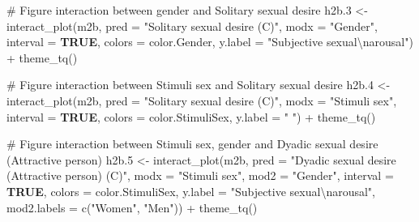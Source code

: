 \documentclass[
  bookmarksnumbered]{article}
\newenvironment{Shaded}{\begin{snugshade}}{\end{snugshade}}
\newcommand{\AttributeTok}[1]{\textcolor[rgb]{0.80,0.80,0.80}{#1}}
\newcommand{\CommentTok}[1]{\textcolor[rgb]{0.50,0.62,0.50}{#1}}
\newcommand{\ConstantTok}[1]{\textcolor[rgb]{0.86,0.64,0.64}{\textbf{#1}}}
\newcommand{\FloatTok}[1]{\textcolor[rgb]{0.75,0.75,0.82}{#1}}
\newcommand{\FunctionTok}[1]{\textcolor[rgb]{0.94,0.94,0.56}{#1}}
\newcommand{\NormalTok}[1]{\textcolor[rgb]{0.80,0.80,0.80}{#1}}
\newcommand{\OtherTok}[1]{\textcolor[rgb]{0.94,0.94,0.56}{#1}}
\newcommand{\SpecialCharTok}[1]{\textcolor[rgb]{0.86,0.64,0.64}{#1}}
\newcommand{\StringTok}[1]{\textcolor[rgb]{0.80,0.58,0.58}{#1}}
\begin{document}
\begin{Shaded}
\begin{Highlighting}[]
\CommentTok{\# Figure interaction between gender and Solitary sexual desire}
\NormalTok{h2b}\FloatTok{.3} \OtherTok{\textless{}{-}} \FunctionTok{interact\_plot}\NormalTok{(m2b, }
                       \AttributeTok{pred =} \StringTok{"Solitary sexual desire (C)"}\NormalTok{,}
                       \AttributeTok{modx =} \StringTok{"Gender"}\NormalTok{,}
                       \AttributeTok{interval =} \ConstantTok{TRUE}\NormalTok{,}
                       \AttributeTok{colors =}\NormalTok{ color.Gender,}
                       \AttributeTok{y.label =} \StringTok{"Subjective sexual}\SpecialCharTok{\textbackslash{}n}\StringTok{arousal"}\NormalTok{) }\SpecialCharTok{+}
  \FunctionTok{theme\_tq}\NormalTok{()}

\CommentTok{\# Figure interaction between Stimuli sex and Solitary sexual desire}
\NormalTok{h2b}\FloatTok{.4} \OtherTok{\textless{}{-}} \FunctionTok{interact\_plot}\NormalTok{(m2b, }
                       \AttributeTok{pred =} \StringTok{"Solitary sexual desire (C)"}\NormalTok{,}
                       \AttributeTok{modx =} \StringTok{"Stimuli sex"}\NormalTok{,}
                       \AttributeTok{interval =} \ConstantTok{TRUE}\NormalTok{,}
                       \AttributeTok{colors =}\NormalTok{ color.StimuliSex,}
                       \AttributeTok{y.label =} \StringTok{" "}\NormalTok{) }\SpecialCharTok{+}
  \FunctionTok{theme\_tq}\NormalTok{()}

\CommentTok{\# Figure interaction between Stimuli sex, gender and Dyadic sexual desire (Attractive person)}
\NormalTok{h2b}\FloatTok{.5} \OtherTok{\textless{}{-}} \FunctionTok{interact\_plot}\NormalTok{(m2b, }
                       \AttributeTok{pred =} \StringTok{"Dyadic sexual desire (Attractive person) (C)"}\NormalTok{, }
                       \AttributeTok{modx =} \StringTok{"Stimuli sex"}\NormalTok{,}
                       \AttributeTok{mod2 =} \StringTok{"Gender"}\NormalTok{,}
                       \AttributeTok{interval =} \ConstantTok{TRUE}\NormalTok{,}
                       \AttributeTok{colors =}\NormalTok{ color.StimuliSex,}
                       \AttributeTok{y.label =} \StringTok{"Subjective sexual}\SpecialCharTok{\textbackslash{}n}\StringTok{arousal"}\NormalTok{,}
                       \AttributeTok{mod2.labels =} \FunctionTok{c}\NormalTok{(}\StringTok{"Women"}\NormalTok{, }\StringTok{"Men"}\NormalTok{)) }\SpecialCharTok{+}
  \FunctionTok{theme\_tq}\NormalTok{()}


\end{Highlighting}
\end{Shaded}
\end{document}
